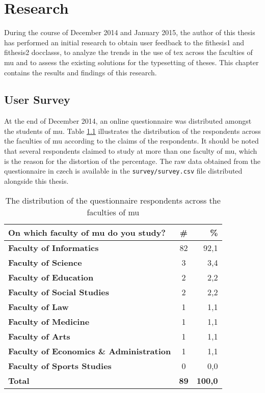 \chapter{Research}
During the course of December 2014 and January 2015, the author of this thesis has performed an initial research to obtain user feedback to the fithesis1 and fithesis2 \glspl{docclass}, to analyze the trends in the use of \gls{tex} across the faculties of \gls{mu} and to assess the existing solutions for the typesetting of theses. This chapter contains the results and findings of this research.

  \section{User Survey}
  At the end of December 2014, an online questionnaire was distributed amongst the students of \gls{mu}. Table \ref{table:survey-faculty} illustrates the distribution of the respondents across the faculties of \gls{mu} according to the claims of the respondents. It should be noted that several respondents claimed to study at more than one faculty of \gls{mu}, which is the reason for the distortion of the percentage. The raw data obtained from the questionnaire in czech is available in the \texttt{survey/survey.csv} file distributed alongside this thesis.

  \begin{table}
    \begin{tabularx}{\textwidth}{Xcr}
      \textbf{On which faculty of \gls{mu} do you study?} & \textbf{\#} & \textbf{\%} \\
      \hline
      \textbf{Faculty of Informatics}                  & 82          & 92,1 \\
      \textbf{Faculty of Science}                      & 3           & 3,4  \\
      \textbf{Faculty of Education}                    & 2           & 2,2  \\
      \textbf{Faculty of Social Studies}               & 2           & 2,2  \\
      \textbf{Faculty of Law}                          & 1           & 1,1  \\
      \textbf{Faculty of Medicine}                     & 1           & 1,1  \\
      \textbf{Faculty of Arts}                         & 1           & 1,1  \\
      \textbf{Faculty of Economics \& Administration}  & 1           & 1,1  \\
      \textbf{Faculty of Sports Studies}               & 0           & 0,0  \\
      \hline
      \textbf{Total}                        & \textbf{89} & \textbf{100,0}
    \end{tabularx}
    \caption{The distribution of the questionnaire respondents across the faculties of \gls{mu}}
    \label{table:survey-faculty}
  \end{table}

